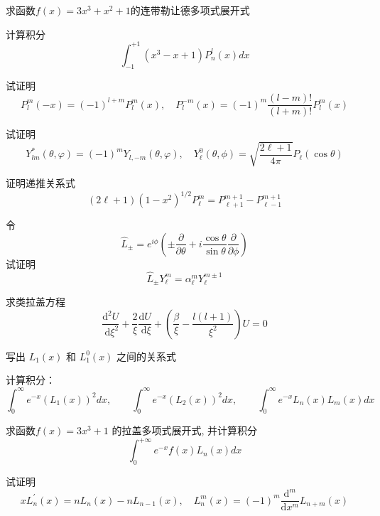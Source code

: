 \begin{Exercises}
		\item 求函数$f(x) = 3x^3+x^2+1$的连带勒让德多项式展开式 \\
		\item 计算积分
		\begin{equation*}
		\int_{-1}^{+1} (x^3 -x +1) P^l _{n}(x) dx 
		\end{equation*}
		\item 试证明
		\[P^m_l(-x) = (-1)^{l+m} P^m_l(x), \quad P^{-m}_l(x) = (-1)^m \frac{(l-m)!}{(l+m)!} P^{m}_l (x) \]
		\item 试证明
		\[ Y^*_{lm}(\theta, \varphi) = (-1)^m Y_{l, -m}(\theta, \varphi), \quad Y_{\ell}^0(\theta, \phi)=\sqrt{\frac{2 \ell+1}{4 \pi}} P_{\ell}(\cos \theta)\]
		\item  证明递推关系式$$
		(2 \ell+1)\left(1-x^2\right)^{1 / 2} P_{\ell}^m=P_{\ell+1}^{m+1}-P_{\ell-1}^{m+1}
		$$
		\item 令 $$
		\hat{L}_{\pm}=e^{i \phi}\left(\pm\frac{\partial}{\partial \theta}+i \frac{\cos \theta}{\sin \theta} \frac{\partial}{\partial \phi}\right)
		$$
		试证明 $$
		\hat{L}_{\pm} Y_{\ell}^m=\alpha_{\ell}^m Y_{\ell}^{m \pm 1}
		$$
		\item  求类拉盖方程
		$$
       \frac{\mathrm{d}^2 U}{\mathrm{~d} \xi^2}+\frac{2}{\xi} \frac{\mathrm{d} U}{\mathrm{~d} \xi}+\left(\frac{\beta}{\xi}-\frac{l(l+1)}{\xi^2}\right) U=0
       $$ 
\item 写出 $L_1 (x)$ 和 $L_1 ^0 (x)$ 之间的关系式 
\item 计算积分：
	\begin{equation*}
		\int_{0}^{\infty}   e^{-x} ( L_1 (x) )^2 dx, \qquad  \int_{0}^{\infty}   e^{-x} ( L_2 (x) )^2 dx, \qquad \int_{0}^{\infty}  e^{-x} L _{n}(x)L _{m}(x)  dx  
	\end{equation*}	
\item 求函数$ f(x) = 3x^3+1 $ 的拉盖多项式展开式, 并计算积分
		\[\int_{0}^{+\infty} e^{-x}f(x)L_n(x) dx \]
\item 试证明
		$$
		x L_n^{\prime}(x)=n L_n(x)-n L_{n-1}(x), \quad  L^m_n (x) = (-1)^m \frac{\mathrm{d}^m}{\mathrm{d}x^m} L_{n+m}(x)
		$$
\end{Exercises}
~~\\


